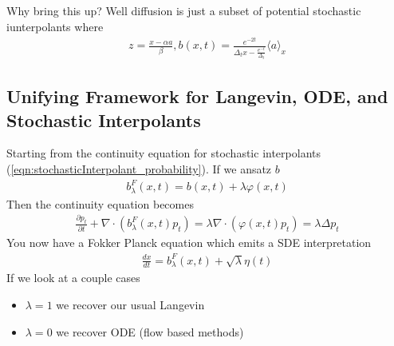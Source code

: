 Why bring this up? Well diffusion is just a subset of potential stochastic iunterpolants where
\begin{align}
	z = \frac{x - \alpha a}{\beta}, b(x,t) = \frac{e^{-2t}}{\Delta _t x - \frac{e^{-t}}{\Delta_t}} \langle a \rangle_x
\end{align}

\subsection{Unifying Framework for Langevin, ODE, and Stochastic Interpolants}
Starting from the continuity equation for stochastic interpolants (\ref{eqn:stochasticInterpolant_probability}). If we ansatz $b$
\begin{align}
	b_\lambda^F(x,t) = b(x,t) + \lambda \varphi(x,t)
\end{align}
Then the continuity equation becomes
\begin{align}
	\frac{\partial p_t}{\partial t}  + \nabla\cdot (b_\lambda^F(x,t) p_t) = \lambda \nabla \cdot (\varphi(x,t) p_t) = \lambda \Delta p_t
\end{align}
You now have a Fokker Planck equation which emits a SDE interpretation
\begin{align}
	\frac{dx}{dt} = b_\lambda^F(x,t) + \sqrt{\lambda} \eta(t)
\end{align}
If we look at a couple cases
\begin{itemize}
	\item $\lambda = 1$ we recover our usual Langevin
	\item $\lambda = 0$ we recover ODE (flow based methods)
\end{itemize}

